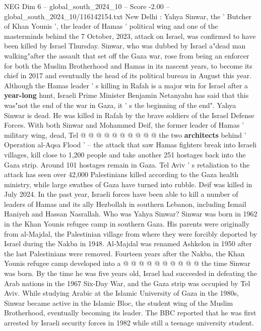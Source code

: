 \begin{textsample}{NEG Dim 6 – global\_south\_2024\_10 – Score -2.00 – global\_south\_2024\_10/116142154.txt}  \label{ex:f6_neg_027}
New Delhi : Yahya Sinwar, the ' Butcher of Khan Younis ', the leader of Hamas ' political wing and one of the masterminds behind the 7 October, 2023, attack on Israel, was confirmed to have been killed by Israel Thursday.
Sinwar, who was dubbed by Israel a"dead man walking"after the assault that set off the Gaza war, rose from being an enforcer for both the Muslim Brotherhood and Hamas in its nascent years, to become its chief in 2017 and eventually the head of its political bureau in August this year.
Although the Hamas leader ' s killing in Rafah is a major win for Israel after a \textbf{year-long} hunt, Israeli Prime Minister Benjamin Netanyahu has said that this was"not the end of the war in Gaza, it ' s the beginning of the end".
Yahya Sinwar is dead.
He was killed in Rafah by the brave soldiers of the Israel Defense Forces.
With both Sinwar and Mohammed Deif, the former leader of Hamas ' military wing, dead, Tel @ @ @ @ @ @ @ @ @ @ the two \textbf{architects} behind ' Operation al-Aqsa Flood ' -- the attack that saw Hamas fighters break into Israeli villages, kill close to 1,200 people and take another 251 hostages back into the Gaza strip.
Around 101 hostages remain in Gaza.
Tel Aviv ' s retaliation to the attack has seen over 42,000 Palestinians killed according to the Gaza health ministry, while large swathes of Gaza have turned into rubble.
Deif was killed in July 2024.
In the past year, Israeli forces have been able to kill a number of leaders of Hamas and its ally Hezbollah in southern Lebanon, including Ismail Haniyeh and Hassan Nasrallah.
Who was Yahya Sinwar?
Sinwar was born in 1962 in the Khan Younis refugee camp in southern Gaza.
His parents were originally from al-Majdal, the Palestinian village from where they were forcibly deported by Israel during the Nakba in 1948.
Al-Majdal was renamed Ashkelon in 1950 after the last Palestinians were removed.
Fourteen years after the Nakba, the Khan Younis refugee camp developed into a @ @ @ @ @ @ @ @ @ @ the time Sinwar was born.
By the time he was five years old, Israel had succeeded in defeating the Arab nations in the 1967 Six-Day War, and the Gaza strip was occupied by Tel Aviv.
While studying Arabic at the Islamic University of Gaza in the 1980s, Sinwar became active in the Islamic Bloc, the student wing of the Muslim Brotherhood, eventually becoming its leader.
The BBC reported that he was first arrested by Israeli security forces in 1982 while still a teenage university student.

\end{textsample}
